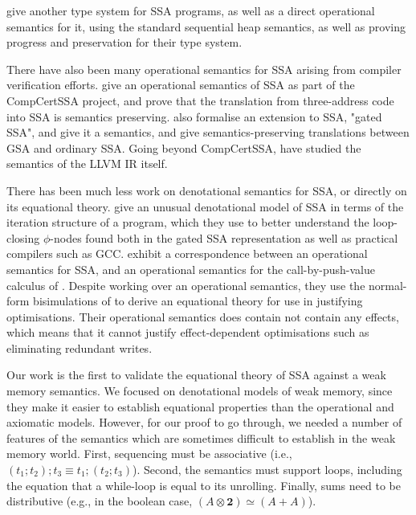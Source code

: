 \documentclass[acmsmall,screen,review]{acmart}
\newcommand{\mb}[1]{\ensuremath{\mathbf{#1}}}
\begin{document}
\citet{hua-explicit-ssa-2010} give another type system for SSA
programs, as well as a direct operational semantics for it, using the
standard sequential heap semantics, as well as proving progress and
preservation for their type system.

There have also been many operational semantics for SSA arising from
compiler verification efforts. \citet{barthe-compcert-ssa-2014} give
an operational semantics of SSA as part of the CompCertSSA project,
and prove that the translation from three-address code into SSA is
semantics preserving. \citet{herklotz-gsa-2023} also formalise an
extension to SSA, "gated SSA", and give it a semantics, and give
semantics-preserving translations between GSA and ordinary SSA. Going
beyond CompCertSSA, \citet{vellum} have studied the semantics of the LLVM
IR itself.

There has been much less work on denotational semantics for SSA, or
directly on its equational theory. \citet{pop-ssa-inout-2009} give an
unusual denotational model of SSA in terms of the iteration structure
of a program, which they use to better understand the loop-closing
$\phi$-nodes found both in the gated SSA representation as well as
practical compilers such as GCC.  \citet{garbuzov-structural-cfg-2018}
exhibit a correspondence between an operational semantics for SSA, and
an operational semantics for the call-by-push-value calculus of
\citet{cbpv}. Despite working over an operational semantics, they use
the normal-form bisimulations of \citet{lassen-bisim} to derive an
equational theory for use in justifying optimisations. Their
operational semantics does contain not contain any effects, which
means that it cannot justify effect-dependent optimisations such as
eliminating redundant writes.

Our work is the first to validate the equational theory of SSA against
a weak memory semantics. We focused on denotational models of weak
memory, since they make it easier to establish equational properties
than the operational and axiomatic models. However, for our proof to
go through, we needed a number of features of the semantics which are
sometimes difficult to establish in the weak memory world. First,
sequencing must be associative (i.e.,
$(t_1; t_2); t_3 \equiv t_1; (t_2; t_3)$).  Second, the semantics must
support loops, including the equation that a while-loop is equal to
its unrolling. Finally, sums need to be distributive (e.g., in the
boolean case, $(A \otimes \mb{2}) \simeq (A + A)$).
\end{document}
